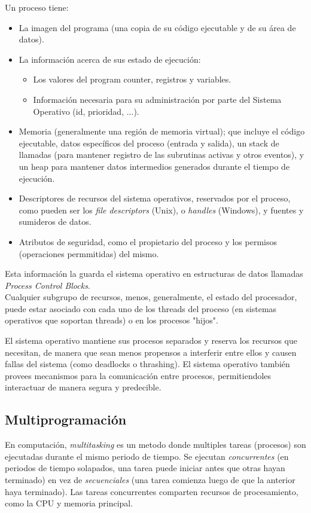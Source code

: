 \documentclass[a4paper, twoside]{article}
\begin{document}
Un proceso tiene:
\begin{itemize}
	\item La imagen del programa (una copia de su código ejecutable y de su área de datos).
	\item La información acerca de sus estado de ejecución:
	\begin{itemize}
		\item Los valores del program counter, registros y variables.
		\item Información necesaria para su administración por parte del Sistema Operativo (id, prioridad, ...).
	\end{itemize}
	\item Memoria (generalmente una región de memoria virtual); que incluye el código ejecutable, datos específicos del proceso (entrada y salida), un stack de llamadas (para mantener registro de las subrutinas activas y otros eventos), y un heap para mantener datos intermedios generados durante el tiempo de ejecución.
	\item Descriptores de recursos del sistema operativos, reservados por el proceso, como pueden ser los \emph{file descriptors} (Unix), o \emph{handles} (Windows), y fuentes y sumideros de datos.
	\item Atributos de seguridad, como el propietario del proceso y los permisos (operaciones permmitidas) del mismo.
\end{itemize}

Esta información la guarda el sistema operativo en estructuras de datos llamadas \emph{Process Control Blocks}.\\

Cualquier subgrupo de recursos, menos, generalmente, el estado del procesador, puede estar asociado con cada uno de los threads del proceso (en sistemas operativos que soportan threads) o en los procesos "hijos".

El sistema operativo mantiene sus procesos separados y reserva los recursos que necesitan, de manera que sean menos propensos a interferir entre ellos y causen fallas del sistema (como deadlocks o thrashing). El sistema operativo también provees mecanismos para la comunicación entre procesos, permitiendoles interactuar de manera segura y predecible.

\subsection{Multiprogramación}
En computación, \emph{multitasking} es un metodo donde multiples tareas (procesos) son ejecutadas durante el mismo periodo de tiempo. Se ejecutan \emph{concurrentes} (en periodos de tiempo solapados, una tarea puede iniciar antes que otras hayan terminado) en vez de \emph{secuenciales} (una tarea comienza luego de que la anterior haya terminado). Las tareas concurrentes comparten recursos de procesamiento, como la CPU y memoria principal.\\
\end{document}
